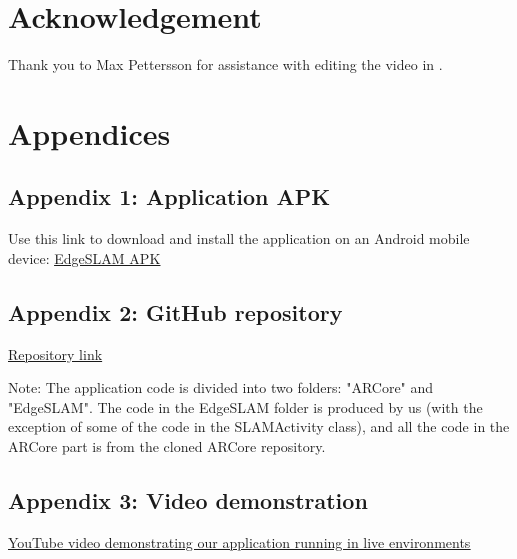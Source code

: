 \documentclass{article}
\begin{document}
\newpage

\section*{Acknowledgement}
Thank you to Max Pettersson for assistance with editing the video in .

  


\section*{Appendices}

\subsection*{Appendix 1: Application APK}

Use this link to download and install the application on an Android mobile device: \underline{\href{https://gofile.io/d/qrnUMs}{EdgeSLAM APK}}

\subsection*{Appendix 2: GitHub repository}

\underline{\href{https://github.com/jonatan-flyckt/edge-project}{Repository link}}

Note: The application code is divided into two folders: "ARCore" and "EdgeSLAM". The code in the EdgeSLAM folder is produced by us (with the exception of some of the code in the SLAMActivity class), and all the code in the ARCore part is from the cloned ARCore repository.

\subsection*{Appendix 3: Video demonstration} \label{demo}
\underline{\href{https://www.youtube.com/watch?v=DzVZ3-SN9z8&feature=youtu.be&fbclid=IwAR3qJmJFWr76Q3OxECmys8Ir4qt6TEGevo86pbrAXv_0whPho_CLZh_HW-M}{YouTube video demonstrating our application running in live environments}}
\end{document}
